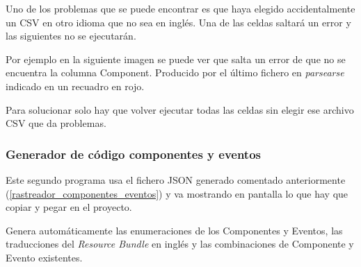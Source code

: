 Uno de los problemas que se puede encontrar es que haya elegido accidentalmente un CSV en otro idioma que no sea en inglés. Una de las celdas saltará un error y las siguientes no se ejecutarán.

Por ejemplo en la siguiente imagen se puede ver que salta un error de que no se encuentra la columna Component. Producido por el último fichero en \textit{parsearse} indicado en un recuadro en rojo.


Para solucionar solo hay que volver ejecutar todas las celdas sin elegir ese archivo CSV que da problemas.

\subsubsection{Generador de código componentes y eventos}

Este segundo programa usa el fichero JSON generado comentado anteriormente (\ref{rastreador_componentes_eventos}) y va mostrando en pantalla lo que hay que copiar y pegar en el proyecto.

Genera automáticamente las enumeraciones de los Componentes y Eventos, las traducciones del \textit{Resource Bundle} en inglés y las combinaciones de Componente y Evento existentes.

